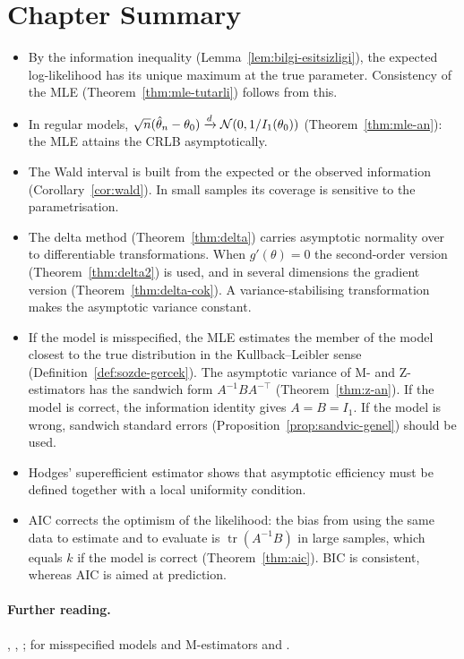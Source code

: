 \documentclass[main.tex]{subfiles}
\begin{document}
\section{Chapter Summary}
\begin{summary}
\begin{itemize}
  \item By the information inequality (Lemma~\ref{lem:bilgi-esitsizligi}), the expected log-likelihood has its unique maximum at the true parameter. Consistency of the MLE (Theorem~\ref{thm:mle-tutarli}) follows from this.
  \item In regular models, $\sqrt n(\hat\theta_n-\theta_0)\xrightarrow{d}\mathcal{N}(0,1/I_1(\theta_0))$ (Theorem~\ref{thm:mle-an}): the MLE attains the CRLB asymptotically.
  \item The Wald interval is built from the expected or the observed information (Corollary~\ref{cor:wald}). In small samples its coverage is sensitive to the parametrisation.
  \item The delta method (Theorem~\ref{thm:delta}) carries asymptotic normality over to differentiable transformations. When $g'(\theta)=0$ the second-order version (Theorem~\ref{thm:delta2}) is used, and in several dimensions the gradient version (Theorem~\ref{thm:delta-cok}). A variance-stabilising transformation makes the asymptotic variance constant.
  \item If the model is misspecified, the MLE estimates the member of the model closest to the true distribution in the Kullback--Leibler sense (Definition~\ref{def:sozde-gercek}). The asymptotic variance of M- and Z-estimators has the sandwich form $A^{-1}BA^{-\top}$ (Theorem~\ref{thm:z-an}). If the model is correct, the information identity gives $A=B=I_1$. If the model is wrong, sandwich standard errors (Proposition~\ref{prop:sandvic-genel}) should be used.
  \item Hodges' superefficient estimator shows that asymptotic efficiency must be defined together with a local uniformity condition.
  \item AIC corrects the optimism of the likelihood: the bias from using the same data to estimate and to evaluate is $\operatorname{tr}(A^{-1}B)$ in large samples, which equals $k$ if the model is correct (Theorem~\ref{thm:aic}). BIC is consistent, whereas AIC is aimed at prediction.
\end{itemize}
\end{summary}

\paragraph{Further reading.} \cite[Chapter~10]{casella}, \cite[Chapters~3, 5 and 8]{vdv}, \cite[Chapters~17--18]{ferguson}; for misspecified models and M-estimators \cite{huber67,white82} and \cite[Chapter~5]{vdv}.
\end{document}
